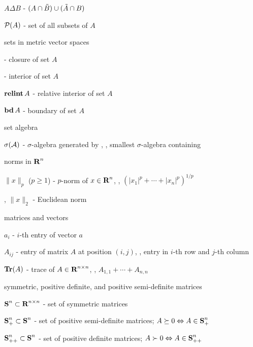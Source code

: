 \documentclass[17pt,landscape]{foils}
\begin{document}
$A\Delta B$ - $(A\cap \tilde{B}) \cup (\tilde{A} \cap B)$
\item
$\mathcal{P}(A)$ - set of all subsets of $A$
\eit
\item
sets in metric vector spaces
\bit
\item
{} - closure of set $A$
\item
{} - interior of set $A$
\item
$\operatorname{\bf relint} A$ - relative interior of set $A$
\item
$\operatorname{\bf bd} A$ - boundary of set $A$
\eit
\item
set algebra
\bit
\item
$\sigma(\mathcal{A})$ - $\sigma$-algebra generated by ,
\ie, smallest $\sigma$-algebra containing 
\eit
\item
norms in $\mbox{\bf R}^n$
\bit
\item
$\|x\|_p$ ($p\geq1$) - $p$-norm of $x\in\mbox{\bf R}^n$, \ie, $(|x_1|^p + \cdots + |x_n|^p)^{1/p}$
\item
\eg, $\|x\|_2$ - Euclidean norm
\eit
\item
matrices and vectors
\bit
\item $a_{i}$ - $i$-th entry of vector $a$
\item $A_{ij}$ - entry of matrix $A$ at position $(i,j)$,
\ie, entry in $i$-th row and $j$-th column
\item $\mathop{\bf Tr}(A)$ - trace of $A \in\mbox{\bf R}^{n\times n}$,
\ie, $A_{1,1}+ \cdots + A_{n,n}$
\eit
\item
symmetric, positive definite, and positive semi-definite matrices
\bit
\item
$\mbox{\bf S}^{n}\subset \mbox{\bf R}^{n\times n}$ - set of symmetric matrices
\item
$\mbox{\bf S}_+^{n}\subset \mbox{\bf S}^{n}$ - set of positive semi-definite matrices;
$A\succeq0 \Leftrightarrow A \in \mbox{\bf S}_+^{n}$
\item
$\mbox{\bf S}_{++}^{n}\subset \mbox{\bf S}^{n}$ - set of positive definite matrices;
$A\succ0 \Leftrightarrow A \in \mbox{\bf S}_{++}^{n}$
\end{document}

